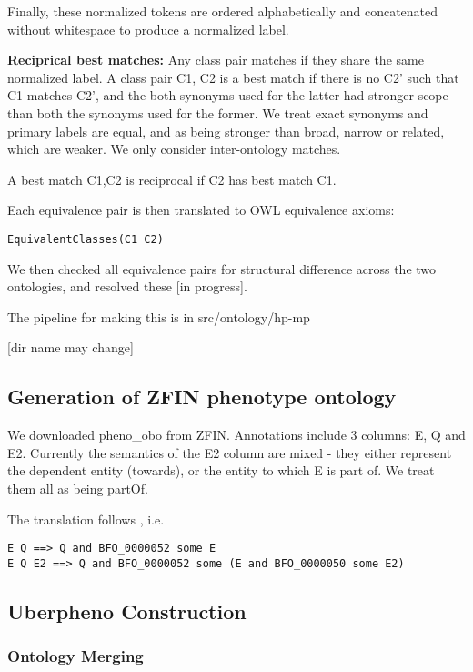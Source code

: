 Finally, these normalized tokens are ordered alphabetically and
concatenated without whitespace to produce a normalized label.

\textbf{Reciprical best matches:} Any class pair matches if they share
the same normalized label. A class pair C1, C2 is a best match if
there is no C2' such that C1 matches C2', and the both synonyms used
for the latter had stronger scope than both the synonyms used for the
former. We treat exact synonyms and primary labels are equal, and as
being stronger than broad, narrow or related, which are weaker. We
only consider inter-ontology matches.

A best match C1,C2 is reciprocal if C2 has best match C1.

Each equivalence pair is then translated to OWL equivalence axioms:

\begin{verbatim}
EquivalentClasses(C1 C2)
\end{verbatim}

We then checked all equivalence pairs for structural difference across
the two ontologies, and resolved these [in progress].

The pipeline for making this is in src/ontology/hp-mp

[dir name may change]

\subsection{Generation of ZFIN phenotype ontology}

We downloaded pheno_obo from ZFIN. Annotations include 3 columns: E, Q
and E2. Currently the semantics of the E2 column are mixed - they
either represent the dependent entity (towards), or the entity to
which E is part of. We treat them all as being partOf.

The translation follows \cite{MungallPheno2009}, i.e.

\begin{verbatim}
E Q ==> Q and BFO_0000052 some E
E Q E2 ==> Q and BFO_0000052 some (E and BFO_0000050 some E2)
\end{verbatim}

\subsection{Uberpheno Construction}

\subsubsection{Ontology Merging}

